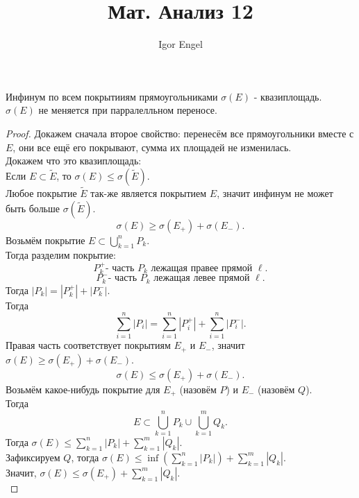 \documentclass[11pt, oneside]{article}   	%
\title{Мат. Анализ 12}
\author{Igor Engel}
\date{}
\begin{document}
\maketitle
\section{}
    \begin{theorem}
        Инфинум по всем покрытииям прямоугольниками $\sigma(E)$ - квазиплощадь.\\
        $\sigma(E)$  не меняется при парралелльном переносе.
        \begin{proof}
            Докажем сначала второе свойство: перенесём все прямоугольники вместе с $E$, они все ещё его покрывают, сумма их площадей не изменилась.\\
            Докажем что это квазиплощадь:\\
            Если $E \subset \tilde{E}$, то $\sigma(E) \le \sigma(\tilde{E})$.\\
            Любое покрытие $\tilde{E}$ так-же является покрытием $E$, значит инфинум не может быть больше $\sigma(\tilde{E})$.\\
            \[ \sigma(E) \ge  \sigma(E_{+}) + \sigma(E_{-}) .\]
            Возьмём покрытие $E \subset \bigcup_{k = 1}^{n}P_k$.\\
            Тогда разделим покрытие:
            \[ P_{k}^{+} \text{- часть $P_k$ лежащая правее прямой  $\ell$} .\]
        \[ P_{k}^{-} \text{- часть $P_k$ лежащая левее прямой  $\ell$} .\]
            Тогда $|P_{k}| = |P_{k}^{+}| + |P_{k}^{-}|$.\\
            Тогда 
            \[ \sum\limits_{i=1}^{n} |P_i| = \sum\limits_{i=1}^{n} |P_{i}^{+}| + \sum\limits_{i=1}^{n} |P_{i}^{-}|.\] 
            Правая часть соответствует покрытиям $E_{+}$ и $E_-$, значит $\sigma(E) \ge \sigma(E_{+}) + \sigma(E_{-})$.
            \[ \sigma(E) \le \sigma(E_{+}) + \sigma(E_{-}) .\]
            Возьмём какое-нибудь покрытие для $E_{+}$ (назовём $P$) и $E_{-}$ (назовём $Q$).\\
            Тогда 
            \[ E \subset  \bigcup_{k=1}^{n}P_{k} \cup \bigcup_{k=1}^{m} Q_k .\]
            Тогда $\sigma(E) \le \sum\limits_{k=1}^{n} |P_k| + \sum\limits_{k=1}^{m} |Q_k|$.\\
            Зафиксируем $Q$, тогда $\sigma(E) \le \inf\left( \sum\limits_{k=1}^{n} |P_k| \right) + \sum\limits_{k=1}^{m} |Q_k|$.\\
            Значит, $\sigma(E) \le \sigma(E_{+}) + \sum\limits_{k=1}^{m} |Q_k|$.\\

\end{proof}
\end{theorem}
\end{document}
